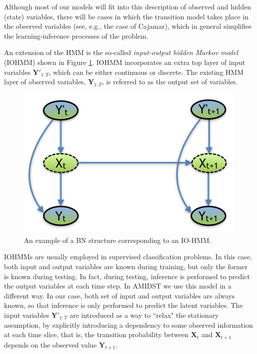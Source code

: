 Although most of our models will fit into this description of observed and hidden (state) variables, there will be cases in which the transition model takes place in the observed variables (see, e.g., the case of Cajamar), which in general simplifies the learning-inference processes of the problem.

An extension of the HMM is the so-called \textit{input-output hidden Markov model} (IOHMM) shown in Figure \ref{Figure:IO-HMM}. IOHMM incorporates an extra top layer of input variables $\bm Y'_{1:T}$, which can be either continuous or discrete. The existing HMM layer of observed variables, $\bm Y_{1:T}$, is referred to as the output set of variables. 

\begin{figure}[ht!]
\begin{center}
\includegraphics[scale=0.4]{./figures/PreliminariesIO-HMM}
\caption{\label{Figure:IO-HMM}An example of a BN structure corresponding to an IO-HMM.}
\end{center}
\end{figure}

IOHMMs are usually employed in supervised classification problems. In this case, both input and output variables are known during training, but only the former is known during testing. In fact, during testing, inference is performed to predict the output variables at each time step. In AMIDST we use this model in a different way. In our case, both set of input and output variables are always known, so that inference is only performed to predict the latent variables. The input variables $\bm Y'_{1:T}$ are introduced as a way to ``relax" the stationary assumption, by explicitly introducing a dependency to some observed information at each time slice, that is, the transition probability between $\bm X_t$ and $\bm X_{t+1}$ depends on the observed value $\bm Y_{t+1}$. 

